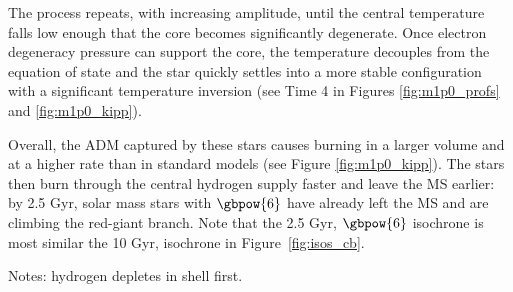   The process repeats, with increasing amplitude, until the central temperature falls low enough that the core becomes significantly degenerate. Once electron degeneracy pressure can support the core, the temperature decouples from the equation of state and the star quickly settles into a more stable configuration with a significant temperature inversion (see Time 4 in Figures \ref{fig:m1p0_profs} and \ref{fig:m1p0_kipp}).

  Overall, the ADM captured by these stars causes burning in a larger volume and at a higher rate than in standard models (see Figure \ref{fig:m1p0_kipp}). The stars then burn through the central hydrogen supply faster and leave the MS earlier: by 2.5 Gyr, solar mass stars with $\gbpow{6}$ have already left the MS and are climbing the red-giant branch. Note that the 2.5 Gyr, $\gbpow{6}$ isochrone is most similar the 10 Gyr, \nodm isochrone in Figure~\ref{fig:isos_cb}.


  Notes:
  hydrogen depletes in shell first.


